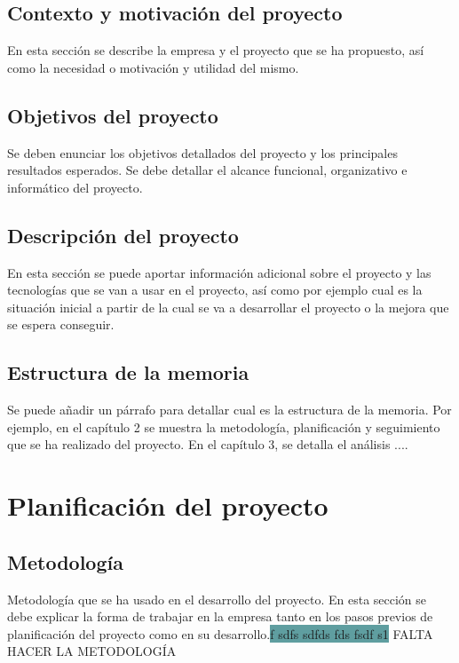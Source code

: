 \documentclass[pdftex,11pt,a4paper]{book}
\begin{document}
\section{Contexto y motivación del proyecto}

En esta sección se describe la empresa y el proyecto que se ha propuesto, así como la necesidad o motivación y utilidad del mismo.

\section{Objetivos del proyecto}

Se deben enunciar los objetivos detallados del proyecto y los principales resultados esperados. Se debe detallar el alcance funcional, organizativo e informático del proyecto.

\section{Descripción del proyecto}

En esta sección se puede aportar información adicional sobre el proyecto y las tecnologías que se van a usar en el proyecto, así como por ejemplo cual es la situación inicial a partir de la cual se va a desarrollar el proyecto o la mejora que se espera conseguir.

\section{Estructura de la memoria}

Se puede añadir un párrafo para detallar cual es la estructura de la memoria. Por ejemplo, en el capítulo 2 se muestra la metodología, planificación y seguimiento que se ha realizado del proyecto. En el capítulo 3, se detalla el análisis ....



\chapter{Planificación del proyecto}

\section{Metodología}

Metodología que se ha usado en el desarrollo del proyecto. En esta sección se debe explicar la forma de trabajar en la empresa tanto en los pasos previos de planificación del proyecto como en su desarrollo.\colorbox{CadetBlue}{f sdfs sdfds fds fsdf s1} FALTA HACER LA METODOLOGÍA
\end{document}
